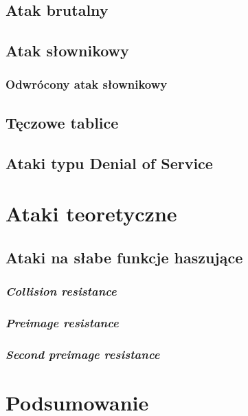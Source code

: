 \documentclass[12pt,a4paper,twoside]{article}
\begin{document}
\subsection{Atak brutalny}

\subsection{Atak słownikowy}

\subsubsection{Odwrócony atak słownikowy}

\subsection{Tęczowe tablice}

\subsection{Ataki typu Denial of Service}

\section{Ataki teoretyczne}

\subsection{Ataki na słabe funkcje haszujące}

\subsubsection{\textit{Collision resistance}}

\subsubsection{\textit{Preimage resistance}}

\subsubsection{\textit{Second preimage resistance}}

\section{Podsumowanie}
\end{document}
